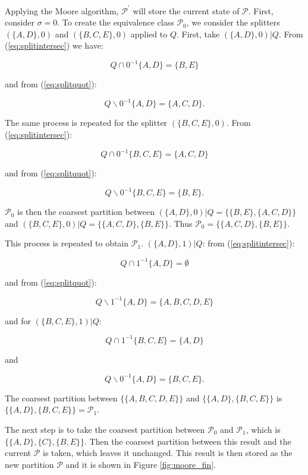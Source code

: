 {Applying the Moore algorithm, $\mathcal{P}^{\prime}$ will store the current state of $\mathcal{P}$. First, consider $\sigma = 0$. To create the equivalence class $\mathcal{P}_0$, we consider the splitters $(\{A,D\},0)$ and $(\{B,C,E\},0)$ applied to $Q$. First, take $(\{A,D\},0)|Q$. From (\ref{eq:splitintersec}) we have:

\[
Q\cap 0^{-1}\{A,D\} = \{B,E\}
\]

\noindent and from (\ref{eq:splitquot}): 

\[
Q\backslash 0^{-1}\{A,D\} = \{A, C, D\}.
\]

\noindent The same process is repeated for the splitter $(\{B,C,E\},0)$. From (\ref{eq:splitintersec}):

\[
Q\cap 0^{-1}\{B,C,E\} = \{A,C,D\}
\]

\noindent and from  (\ref{eq:splitquot}):

\[
Q\backslash 0^{-1}\{B,C,E\} = \{B,E\}.
\]

\noindent $\mathcal{P}_0$ is then the coarsest partition between $(\{A,D\},0)|Q = \{\{B,E\},\{A,C,D\}\}$ and \linebreak $(\{B,C,E\},0)|Q = \{\{A,C,D\},\{B,E\}\}$. Thus $\mathcal{P}_0 = \{\{A,C,D\},\{B,E\}\}$.

This process is repeated to obtain $\mathcal{P}_1$. $(\{A,D\},1)|Q$: from (\ref{eq:splitintersec}):

\[
Q\cap 1^{-1}\{A,D\} = \emptyset
\]

\noindent and from (\ref{eq:splitquot}):

\[
Q\backslash 1^{-1}\{A,D\} = \{A, B, C, D, E\}
\]

\noindent and for $(\{B,C,E\},1)|Q$: 

\[
Q\cap 1^{-1}\{B,C,E\} = \{A,D\}
\]

\noindent and 

\[
Q\backslash 0^{-1}\{A,D\} = \{B, C, E\}.
\]

\noindent The coarsest partition between $\{\{A,B,C,D,E\}\}$ and \linebreak $\{\{A,D\},\{B,C,E\}\}$ is $\{\{A,D\},\{B,C,E\}\} = \mathcal{P}_1$.

The next step is to take the coarsest partition between $\mathcal{P}_0$ and $\mathcal{P}_1$, which is $\{\{A,D\},\{C\},\{B,E\}\}$. Then the coarsest partition between this result and the current $\mathcal{P}$ is taken, which leaves it unchanged. This result is then stored as the new partition $\mathcal{P}$ and it is shown in Figure \ref{fig:moore_fin}.


}
